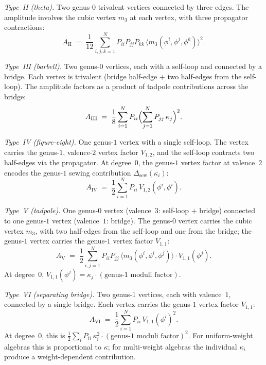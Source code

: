 \begin{construction}
\medskip\noindent
\emph{Type~II (theta).} Two genus-$0$ trivalent vertices connected by
three edges. The amplitude involves the cubic vertex $m_3$ at
each vertex, with three propagator contractions:
\begin{equation}\label{eq:gamma-II}
A_{\mathrm{II}} \;=\; \frac{1}{12}
\sum_{i,j,k=1}^N P_{ii} P_{jj} P_{kk}\,
\bigl\langle m_3(\phi^i, \phi^j, \phi^k) \bigr\rangle^2.
\end{equation}

\medskip\noindent
\emph{Type~III (barbell).} Two genus-$0$ vertices, each with a
self-loop and connected by a bridge. Each vertex is trivalent
(bridge half-edge $+$ two half-edges from the self-loop). The
amplitude factors as a product of tadpole contributions across
the bridge:
\begin{equation}\label{eq:gamma-III}
A_{\mathrm{III}} \;=\; \frac{1}{8}
\sum_{i=1}^N P_{ii}
\Bigl(\sum_{j=1}^N P_{jj}\,\kappa_j \Bigr)^2.
\end{equation}

\medskip\noindent
\emph{Type~IV (figure-eight).} One genus-$1$ vertex with a
single self-loop. The vertex carries the genus-$1$, valence-$2$
vertex factor $V_{1,2}$, and the self-loop contracts two
half-edges via the propagator. At degree~$0$, the genus-$1$
vertex factor at valence~$2$ encodes the genus-$1$ sewing
contribution $\Delta_{\mathrm{sew}}(\kappa_i)$:
\begin{equation}\label{eq:gamma-IV}
A_{\mathrm{IV}} \;=\; \frac{1}{2}
\sum_{i=1}^N P_{ii}\, V_{1,2}(\phi^i, \phi^i).
\end{equation}

\medskip\noindent
\emph{Type~V (tadpole).} One genus-$0$ vertex (valence~$3$:
self-loop $+$ bridge) connected to one genus-$1$ vertex
(valence~$1$: bridge). The genus-$0$ vertex carries the cubic
vertex $m_3$, with two half-edges from the self-loop and one
from the bridge; the genus-$1$ vertex carries the genus-$1$
vertex factor $V_{1,1}$:
\begin{equation}\label{eq:gamma-V}
A_{\mathrm{V}} \;=\; \frac{1}{2}
\sum_{i,j=1}^N P_{ii} P_{jj}\,
\bigl\langle m_3(\phi^i, \phi^i, \phi^j) \bigr\rangle
\cdot V_{1,1}(\phi^j).
\end{equation}
At degree~$0$, $V_{1,1}(\phi^j) = \kappa_j \cdot
(\text{genus-$1$ moduli factor})$.

\medskip\noindent
\emph{Type~VI (separating bridge).} Two genus-$1$ vertices,
each with valence~$1$, connected by a single bridge. Each
vertex carries the genus-$1$ vertex factor $V_{1,1}$:
\begin{equation}\label{eq:gamma-VI}
A_{\mathrm{VI}} \;=\; \frac{1}{2}
\sum_{i=1}^N P_{ii}\, V_{1,1}(\phi^i)^2.
\end{equation}
At degree~$0$, this is $\frac{1}{2} \sum_i P_{ii}\, \kappa_i^2
\cdot (\text{genus-$1$ moduli factor})^2$. For uniform-weight
algebras this is proportional to $\kappa$; for multi-weight
algebras the individual $\kappa_i$ produce a weight-dependent
contribution.
\end{construction}

